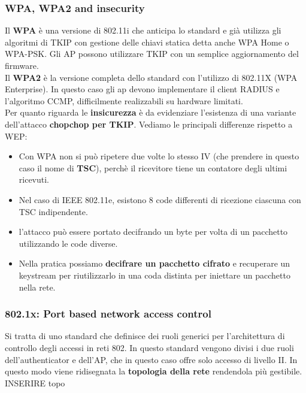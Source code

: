 \documentclass[12pt]{article}
\begin{document}
			\subsubsection{WPA, WPA2 and insecurity}
				Il \textbf{WPA} è una versione di 802.11i che anticipa lo standard e già utilizza gli algoritmi di TKIP con gestione delle chiavi statica detta anche WPA Home o WPA-PSK. Gli AP possono utilizzare TKIP  con un semplice aggiornamento del firmware.\\
				Il \textbf{WPA2} è la versione completa dello standard con l'utilizzo di 802.11X (WPA Enterprise). In questo caso gli ap devono implementare il client RADIUS e l'algoritmo CCMP, difficilmente realizzabili su hardware limitati.\\
				Per quanto riguarda le \textbf{insicurezza} è da evidenziare l'esistenza di una variante dell'attacco \textbf{chopchop per TKIP}. Vediamo le principali differenze rispetto a WEP:
				\begin{itemize}
					\item Con WPA non si può ripetere due volte lo stesso IV (che prendere in questo caso il nome di \textbf{TSC}), perchè il ricevitore tiene un contatore degli ultimi ricevuti.
					\item Nel caso di IEEE 802.11e, esistono 8 code differenti di ricezione ciascuna con TSC indipendente.
					\item l'attacco può essere portato decifrando un byte per volta di un pacchetto utilizzando le code diverse.
					\item Nella pratica possiamo \textbf{decifrare un pacchetto cifrato} e recuperare un keystream per riutilizzarlo in una coda distinta per iniettare un pacchetto nella rete.
				\end{itemize}                                                   
			\subsubsection{802.1x: Port based network access control}
				Si tratta di uno standard che definisce dei ruoli generici per l'architettura di controllo degli accessi in reti 802. In questo standard vengono divisi i due ruoli dell'authenticator e dell'AP, che in questo caso offre solo accesso di livello II. In questo modo viene ridisegnata la \textbf{topologia della rete} rendendola più gestibile.\\
				
				INSERIRE topo\\
				
\end{document}
